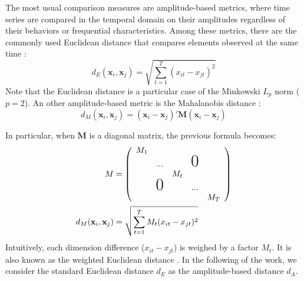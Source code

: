 The most usual comparison measures are amplitude-based metrics, where time series are compared in the temporal domain on their amplitudes regardless of their behaviors or frequential characteristics. Among these metrics, there are the commonly used Euclidean distance that compares elements observed at the same time \cite{Ding2008}: 
\begin{equation}	
	d_E(\textbf{x}_i,\textbf{x}_j) = \sqrt{\sum\limits_{t=1}^{T} (x_{it}-x_{jt})^2}
\label{eq:A}
\end{equation}
Note that the Euclidean distance is a particular case of the Minkowski $L_p$ norm ($p=2$). An other amplitude-based metric is the Mahalanobis distance \cite{Prekopcsak2012}:
\begin{equation}	
	d_M(\textbf{x}_i,\textbf{x}_j) = (\textbf{x}_i-\textbf{x}_j)'\textbf{M}(\textbf{x}_i-\textbf{x}_j)
	\label{eq:dM}
\end{equation}

\noindent In particular, when $\textbf{M}$ is a diagonal matrix, the previous formula becomes: 
\begin{align}
M &= 
	\left(
	\begin{array}{ccccc}
	M_1\\
	& ... & & \text{\huge0}\\
	& & M_t & &\\
	& \text{\huge0} & & ... \\
	& & & & M_T
	\end{array}
	\right)	\\
d_M(\textbf{x}_i,\textbf{x}_j) & = \sqrt{\sum\limits_{t=1}^{T} M_t(x_{it}-x_{jt})^2}
\label{eq:dM2}
\end{align}
Intuitively, each dimension difference ($x_{it}-x_{jt}$) is weighed by a factor $M_t$. It is also known as the weighted Euclidean distance \cite{McNames2002}. In the following of the work, we consider the standard Euclidean distance $d_E$ as the amplitude-based distance $d_A$.


